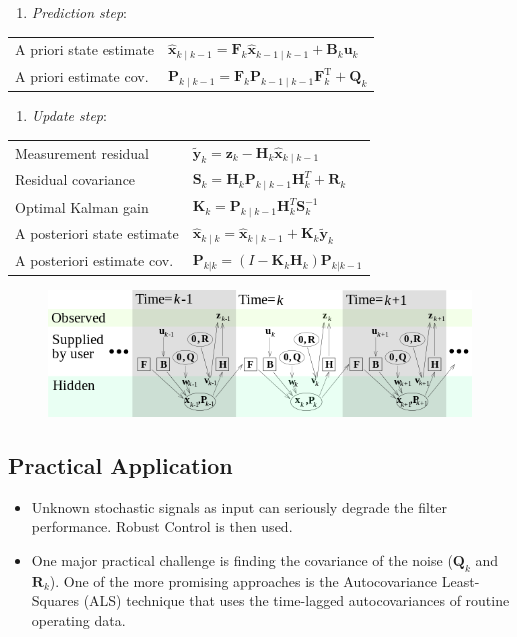 \documentclass[twocolumn]{article}
\numberwithin{equation}{section}
\begin{document}
\begin{enumerate}
	\item \emph{Prediction step}:
\end{enumerate}
\begin{tabular}{ p{}p{} }
A priori state estimate	& $\hat{\mathbf{x}}_{k\mid k-1} = \mathbf{F}_{k}\hat{\mathbf{x}}_{k-1\mid k-1} + \mathbf{B}_{k} \mathbf{u}_{k}$\\
A priori estimate cov. & $\mathbf{P}_{k\mid k-1} =  \mathbf{F}_{k} \mathbf{P}_{k-1\mid k-1} \mathbf{F}_{k}^{\text{T}} + \mathbf{Q}_{k}$ 
\end{tabular}
\begin{enumerate}[resume]
	\item \emph{Update step}: \newline
\end{enumerate}
\begin{tabular}{ p{}p{} }
Measurement residual	&
$\tilde{\mathbf{y}}_k = \mathbf{z}_k - \mathbf{H}_k\hat{\mathbf{x}}_{k\mid k-1}$\\
Residual covariance	&
$\mathbf{S}_k = \mathbf{H}_k \mathbf{P}_{k\mid k-1} \mathbf{H}_k^T + \mathbf{R}_k $\\
Optimal Kalman gain	&
$\mathbf{K}_k = \mathbf{P}_{k\mid k-1}\mathbf{H}_k^T \mathbf{S}_k^{-1}$\\
A posteriori state estimate	&
$\hat{\mathbf{x}}_{k\mid k} = \hat{\mathbf{x}}_{k\mid k-1} + \mathbf{K}_k\tilde{\mathbf{y}}_k$\\
A posteriori estimate cov.	&
$\mathbf{P}_{k|k} = (I - \mathbf{K}_k \mathbf{H}_k) \mathbf{P}_{k|k-1}$\\
\end{tabular}

\begin{figure}[H]
    \centering
    \includegraphics[width=.49\textwidth]{Kalman_filter_model_2.png}
\end{figure}



	\subsection{Practical Application}
\begin{itemize}
	\item Unknown stochastic signals as input can seriously degrade the filter performance. Robust Control is then used.
	\item One major practical challenge is finding the covariance of the noise ($\mathbf{Q}_k$ and $\mathbf{R}_k$). One of the more promising approaches is the Autocovariance Least-Squares (ALS) technique that uses the time-lagged autocovariances of routine operating data.
\end{itemize}
\end{document}
